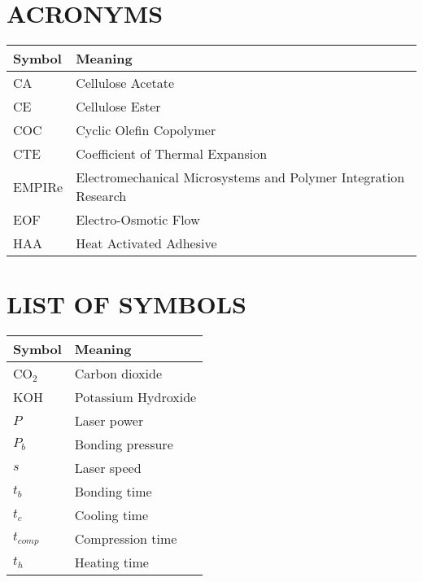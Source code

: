

\chapter*{\center\Huge{ACRONYMS}}



\begin{center}\small
\begin{tabular}{ll}\hline
\textbf{Symbol} & \textbf{Meaning}\\\hline
CA & Cellulose Acetate\\
CE & Cellulose Ester\\
COC & Cyclic Olefin Copolymer\\
CTE &Coefficient of Thermal Expansion\\
EMPIRe & Electromechanical Microsystems and Polymer Integration Research\\
EOF & Electro-Osmotic Flow\\
HAA & Heat Activated Adhesive\\


\hline
\end{tabular}
\end{center}

\chapter*{\center\Huge{LIST OF SYMBOLS}}



\begin{center}
\begin{tabular}{ll}\hline
\textbf{Symbol} & \textbf{Meaning}\\\hline
CO$_2$ & Carbon dioxide\\
KOH& Potassium Hydroxide\\ 
$P$ & Laser power\\
$P_b$ & Bonding pressure\\
$s$ & Laser speed\\
$t_b$ & Bonding time\\
$t_c$ & Cooling time\\
$t_{comp}$ & Compression time\\
$t_h$ & Heating time\\

\hline
\end{tabular}
\end{center}
